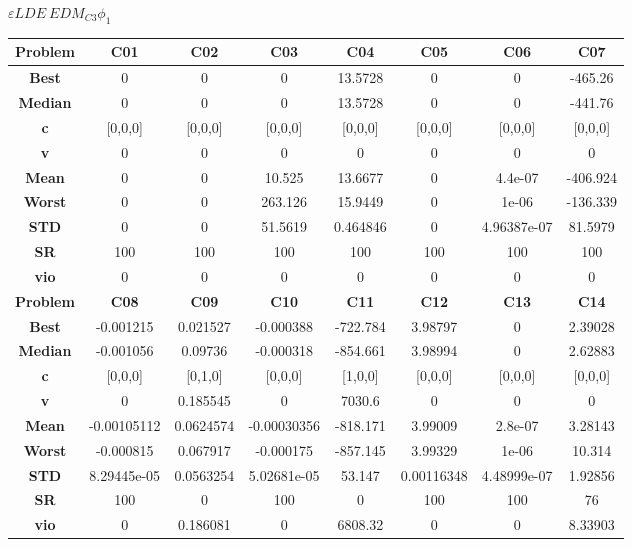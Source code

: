 \documentclass{IEEEtran}
\begin{document}
\begin{center}
$\varepsilon LDE\ EDM_{C3} \phi_1$
  \begin{tabular}{|c|c|c|c|c|c|c|c|}
    \hline 
    \textbf{Problem} & \textbf{C01} & \textbf{C02} & \textbf{C03} & \textbf{C04} & \textbf{C05} & \textbf{C06} & \textbf{C07} \\ 
    \hline\hline 
    \textbf{Best} & 0 & 0 & 0 & 13.5728 & 0 & 0 & -465.26\\ 
    \textbf{Median} & 0 & 0 & 0 & 13.5728 & 0 & 0 & -441.76\\ 
    \textbf{c} & [0,0,0] & [0,0,0] & [0,0,0] & [0,0,0] & [0,0,0] & [0,0,0] & [0,0,0]\\ 
    \textbf{v} & 0 & 0 & 0 & 0 & 0 & 0 & 0\\ 
    \textbf{Mean} & 0 & 0 & 10.525 & 13.6677 & 0 & 4.4e-07 & -406.924\\ 
    \textbf{Worst} & 0 & 0 & 263.126 & 15.9449 & 0 & 1e-06 & -136.339\\ 
    \textbf{STD} & 0 & 0 & 51.5619 & 0.464846 & 0 & 4.96387e-07 & 81.5979\\ 
    \textbf{SR} & 100 & 100 & 100 & 100 & 100 & 100 & 100\\ 
    \textbf{vio} & 0 & 0 & 0 & 0 & 0 & 0 & 0\\ 
    \hline 
    \hline 
    \textbf{Problem} & \textbf{C08} & \textbf{C09} & \textbf{C10} & \textbf{C11} & \textbf{C12} & \textbf{C13} & \textbf{C14} \\ 
    \hline\hline 
    \textbf{Best} & -0.001215 & 0.021527 & -0.000388 & -722.784 & 3.98797 & 0 & 2.39028\\ 
    \textbf{Median} & -0.001056 & 0.09736 & -0.000318 & -854.661 & 3.98994 & 0 & 2.62883\\ 
    \textbf{c} & [0,0,0] & [0,1,0] & [0,0,0] & [1,0,0] & [0,0,0] & [0,0,0] & [0,0,0]\\ 
    \textbf{v} & 0 & 0.185545 & 0 & 7030.6 & 0 & 0 & 0\\ 
    \textbf{Mean} & -0.00105112 & 0.0624574 & -0.00030356 & -818.171 & 3.99009 & 2.8e-07 & 3.28143\\ 
    \textbf{Worst} & -0.000815 & 0.067917 & -0.000175 & -857.145 & 3.99329 & 1e-06 & 10.314\\ 
    \textbf{STD} & 8.29445e-05 & 0.0563254 & 5.02681e-05 & 53.147 & 0.00116348 & 4.48999e-07 & 1.92856\\ 
    \textbf{SR} & 100 & 0 & 100 & 0 & 100 & 100 & 76\\ 
    \textbf{vio} & 0 & 0.186081 & 0 & 6808.32 & 0 & 0 & 8.33903\\ 

\end{tabular}
\end{center}
\end{document}
